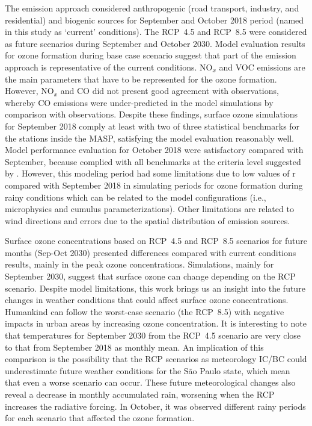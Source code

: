 The emission approach considered anthropogenic (road transport, industry, and residential) and biogenic sources for September and October 2018 period (named in this study as `current' conditions). The RCP~4.5 and RCP~8.5 were considered as future scenarios during September and October 2030.
Model evaluation results for ozone formation during base case scenario suggest that part of the emission approach is representative of the current conditions.
NO$_x$ and VOC emissions are the main parameters that have to be represented for the ozone formation.
However, NO$_x$ and CO did not present good agreement with observations, whereby CO emissions were under-predicted in the model simulations by comparison with observations.
Despite these findings, surface ozone simulations for September 2018 comply at least with two of three statistical benchmarks for the stations inside the MASP, satisfying the model evaluation reasonably well. 
Model performance evaluation for October 2018 were satisfactory compared with September, because complied with all benchmarks at the criteria level suggested by \citet{Emery2017}.
However, this modeling period had some limitations due to low values of r compared with September 2018 in simulating periods for ozone formation during rainy conditions which can be related to the model configurations (i.e., microphysics and cumulus parameterizations).
Other limitations are related to wind directions and errors due to the spatial distribution of emission sources.  

Surface ozone concentrations based on RCP~4.5 and RCP~8.5 scenarios for future months (Sep-Oct 2030) presented differences compared with current conditions results, mainly in the peak ozone concentrations.
Simulations, mainly for September 2030, suggest that surface ozone can change depending on the RCP scenario.
Despite model limitations, this work brings us an insight into the future changes in weather conditions that could affect surface ozone concentrations. 
Humankind can follow the worst-case scenario (the RCP~8.5) with negative impacts in urban areas by increasing ozone concentration.
It is interesting to note that temperatures for September 2030 from the RCP~4.5 scenario are very close to that from September 2018 as monthly mean.
An implication of this comparison is the possibility that the RCP scenarios as meteorology IC/BC could underestimate future weather conditions for the S\~{a}o Paulo state, which mean that even a worse scenario can occur.
These future meteorological changes also reveal a decrease in monthly accumulated rain, worsening when the RCP increases the radiative forcing.
In October, it was observed different rainy periods for each scenario that affected the ozone formation.

